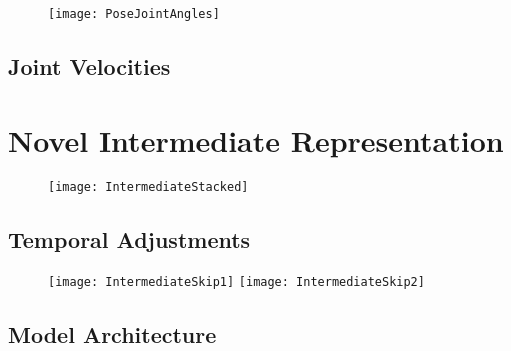 \begin{figure}[h]
	\texttt{[image: PoseJointAngles]}
	\centering
	\caption{}
	\label{fig:pose-joint-angles}
\end{figure}

\subsection{Joint Velocities}

\section{Novel Intermediate Representation}

\begin{figure}[h]
	\texttt{[image: IntermediateStacked]}
	\centering
	\caption{}
	\label{fig:intermediate-stacked}
\end{figure}

\subsection{Temporal Adjustments}

\begin{figure}
	\texttt{[image: IntermediateSkip1]}
	\texttt{[image: IntermediateSkip2]}
	\centering
	\caption{}
	\label{fig:intermediate-stacked-skip}
\end{figure}

\subsection{Model Architecture}